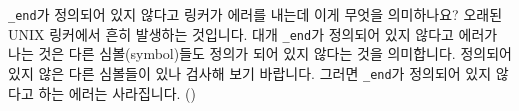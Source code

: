 \begin{faq}
	\verb+_end+가 정의되어 있지 않다고 링커가 에러를 내는데 이게
	무엇을 의미하나요?
\A
	오래된 UNIX 링커에서 흔히 발생하는 것입니다.  대개 \verb+_end+가
	정의되어 있지 않다고 에러가 나는 것은 다른 심볼(symbol)들도
	정의가 되어 있지 않다는 것을 의미합니다.  정의되어 있지 않은
	다른 심볼들이 있나 검사해 보기 바랍니다.  그러면 \verb+_end+가
	정의되어 있지 않다고 하는 에러는 사라집니다.  ()
\end{faq}

%
%
